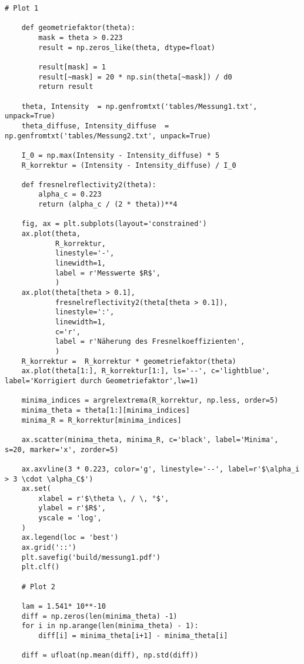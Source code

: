 \begin{lstlisting}
# Plot 1

    def geometriefaktor(theta):
        mask = theta > 0.223
        result = np.zeros_like(theta, dtype=float)
    
        result[mask] = 1
        result[~mask] = 20 * np.sin(theta[~mask]) / d0
        return result
    
    theta, Intensity  = np.genfromtxt('tables/Messung1.txt', unpack=True)
    theta_diffuse, Intensity_diffuse  = np.genfromtxt('tables/Messung2.txt', unpack=True)
    
    I_0 = np.max(Intensity - Intensity_diffuse) * 5         
    R_korrektur = (Intensity - Intensity_diffuse) / I_0
        
    def fresnelreflectivity2(theta):
        alpha_c = 0.223
        return (alpha_c / (2 * theta))**4
    
    fig, ax = plt.subplots(layout='constrained')
    ax.plot(theta,
            R_korrektur,
            linestyle='-',
            linewidth=1,
            label = r'Messwerte $R$',
            )
    ax.plot(theta[theta > 0.1],
            fresnelreflectivity2(theta[theta > 0.1]),
            linestyle=':',
            linewidth=1,
            c='r',
            label = r'Näherung des Fresnelkoeffizienten',
            )
    R_korrektur =  R_korrektur * geometriefaktor(theta)
    ax.plot(theta[1:], R_korrektur[1:], ls='--', c='lightblue', label='Korrigiert durch Geometriefaktor',lw=1)
    
    minima_indices = argrelextrema(R_korrektur, np.less, order=5)
    minima_theta = theta[1:][minima_indices]
    minima_R = R_korrektur[minima_indices]
    
    ax.scatter(minima_theta, minima_R, c='black', label='Minima', s=20, marker='x', zorder=5)
    
    ax.axvline(3 * 0.223, color='g', linestyle='--', label=r'$\alpha_i > 3 \cdot \alpha_C$')
    ax.set(
        xlabel = r'$\theta \, / \, °$',
        ylabel = r'$R$',
        yscale = 'log',
    )
    ax.legend(loc = 'best')
    ax.grid('::')
    plt.savefig('build/messung1.pdf')
    plt.clf()
    
    # Plot 2
    
    lam = 1.541* 10**-10
    diff = np.zeros(len(minima_theta) -1)
    for i in np.arange(len(minima_theta) - 1):
        diff[i] = minima_theta[i+1] - minima_theta[i]
    
    diff = ufloat(np.mean(diff), np.std(diff))
    

\end{lstlisting}
